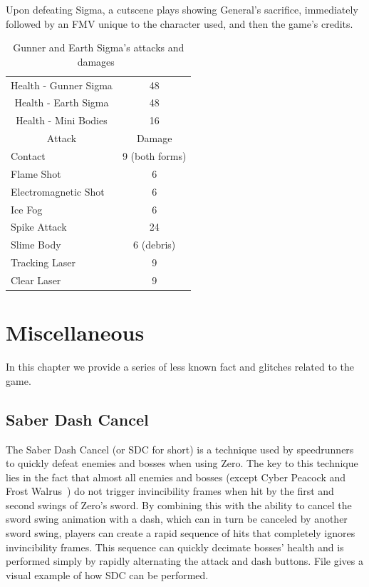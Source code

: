 Upon defeating Sigma, a cutscene plays showing General’s sacrifice, immediately followed by an FMV unique to the character used, and then the game’s credits.
 
\begin{table}[htp]
	\centering
	\begin{tabular}[h]{l c}
		\toprule
		\multicolumn{1}{c}{Health - Gunner Sigma}  & 48\\
		\multicolumn{1}{c}{Health - Earth Sigma}  & 48\\
		\multicolumn{1}{c}{Health - Mini Bodies}  & 16\\
		\midrule
		\multicolumn{1}{c}{Attack} & \multicolumn{1}{c}{Damage}\\
		Contact & 9 (both forms) \\
		Flame Shot &6 \\		
		Electromagnetic Shot &6 \\
		Ice Fog &6 \\
		Spike Attack&24 \\
		Slime Body& 6 (debris)\\
		Tracking Laser & 9\\
		Clear Laser & 9\\
		\bottomrule
	\end{tabular}
	\caption{Gunner and Earth Sigma's attacks and damages~\cite{book:Compendium,wiki:Sigma_X4}}
\end{table}
 
 
\chapter{Miscellaneous}\label{X4:misc} %
In this chapter we provide a series of less known fact and glitches related to the game.

\section{Saber Dash Cancel}\label{SDC}
The Saber Dash Cancel (or SDC for short) is a technique used by speedrunners to quickly defeat enemies and bosses when using Zero. The key to this technique lies in the fact that almost all enemies and bosses (except Cyber Peacock and Frost Walrus~\cite{wiki:X4_tricks}) do not trigger invincibility frames when hit by the first and second swings of Zero's sword. By combining this with the ability to cancel the sword swing animation with a dash, which can in turn be canceled by another sword swing, players can create a rapid sequence of hits that completely ignores invincibility frames. This sequence can quickly decimate bosses' health and is performed simply by rapidly alternating the attack and dash buttons. File  gives a visual example of how SDC can be performed.


